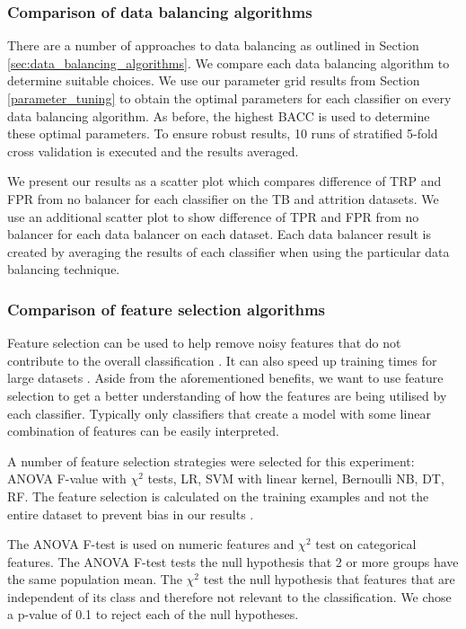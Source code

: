 \documentclass{sig-alternate-05-2015}
\begin{document}
	\subsubsection{Comparison of data balancing algorithms}
	There are a number of approaches to data balancing as outlined in Section \ref{sec:data_balancing_algorithms}. We compare each data balancing algorithm to determine suitable choices. We use our parameter grid results from Section \ref{parameter_tuning} to obtain the optimal parameters for each classifier on every data balancing algorithm. As before, the highest BACC is used to determine these optimal parameters. To ensure robust results, 10 runs of stratified 5-fold cross validation is executed and the results averaged.
	
	We present our results as a scatter plot which compares difference of TRP and FPR from no balancer for each classifier on the TB and attrition datasets. We use an additional scatter plot to show difference of TPR and FPR from no balancer for each data balancer on each dataset. Each data balancer result is created by averaging the results of each classifier when using the particular data balancing technique.
	
	\subsubsection{Comparison of feature selection algorithms}
	Feature selection can be used to help remove noisy features that do not contribute to the overall classification \cite{Guyon:2003:IVF:944919.944968}. It can also speed up training times for large datasets \cite{Guyon:2003:IVF:944919.944968}. Aside from the aforementioned benefits, we want to use feature selection to get a better understanding of how the features are being utilised by each classifier. Typically only classifiers that create a model with some linear combination of features can be easily interpreted.
	
	A number of feature selection strategies were selected for this experiment: ANOVA F-value with $\chi^2$ tests, LR, SVM with linear kernel, Bernoulli NB, DT, RF. The feature selection is calculated on the training examples and not the entire dataset to prevent bias in our results \cite{PMID:25988841}.
	
	The ANOVA F-test is used on numeric features and $\chi^2$ test on categorical features. The ANOVA F-test tests the null hypothesis that 2 or more groups have the same population mean. The $\chi^2$ test the null hypothesis that features that are independent of its class and therefore not relevant to the classification. We chose a p-value of 0.1 to reject each of the null hypotheses. 
	
\end{document}
